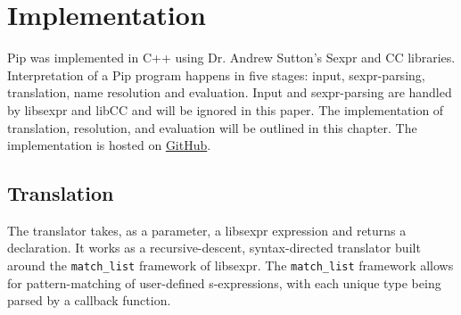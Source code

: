 \section{Implementation}

Pip was implemented in C++ using Dr. Andrew Sutton's Sexpr and CC libraries. Interpretation of a Pip program happens in five stages: input, sexpr-parsing, translation, name resolution and evaluation. Input and sexpr-parsing are handled by libsexpr and libCC and will be ignored in this paper. The implementation of translation, resolution, and evaluation will be outlined in this chapter. The implementation is hosted on \href{https://github.com/asutton/pip/}{GitHub}.

\subsection{Translation}
The translator takes, as a parameter, a libsexpr expression and returns a declaration. It works as a recursive-descent, syntax-directed translator built around the \texttt{match\_list} framework of libsexpr. The \texttt{match\_list} framework allows for pattern-matching of user-defined s-expressions, with each unique type being parsed by a callback function.

